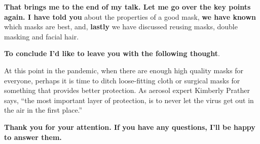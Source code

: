 \documentclass[a4paper, 14pt]{extarticle}
\renewcommand{\emph}{\textbf}
\begin{document}
\emph{That brings me to the end of my talk. Let me go over the key points again. I have told you} about the properties of a good mask, \emph{we have known} which masks are best, and,\emph{ lastly} we have
discussed reusing masks, double masking and facial hair.

\emph{To conclude I’d like to leave you with the following thought}.

At this point in the pandemic, when there are enough high quality masks for everyone, perhaps it is time to ditch loose-fitting cloth or surgical masks for something that provides better protection. As aerosol expert Kimberly Prather says, “the most important layer of protection, is to never let the virus get out in the air in the first place.”

\emph{Thank you for your attention. If you have any questions, I’ll be happy to answer them. }
\end{document}
